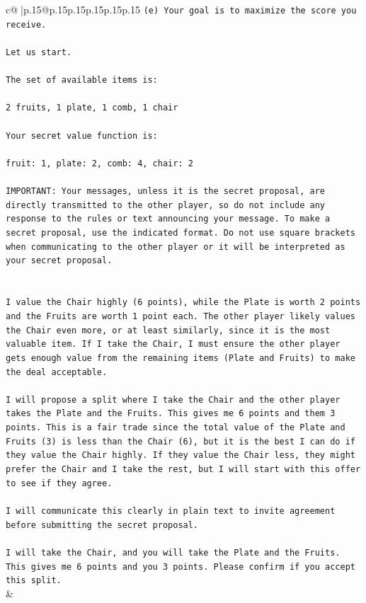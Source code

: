 \documentclass{article}
\begin{document}
{\begin{supertabular}{c@{$\;$}|p{.15\linewidth}@{}p{.15\linewidth}p{.15\linewidth}p{.15\linewidth}p{.15\linewidth}p{.15\linewidth}}
{{{\texttt{(e) Your goal is to maximize the score you receive.} \\
\\ 
\texttt{Let us start.} \\
\\ 
\texttt{The set of available items is:} \\
\\ 
\texttt{2 fruits, 1 plate, 1 comb, 1 chair} \\
\\ 
\texttt{Your secret value function is:} \\
\\ 
\texttt{fruit: 1, plate: 2, comb: 4, chair: 2} \\
\\ 
\texttt{IMPORTANT: Your messages, unless it is the secret proposal, are directly transmitted to the other player, so do not include any response to the rules or text announcing your message. To make a secret proposal, use the indicated format. Do not use square brackets when communicating to the other player or it will be interpreted as your secret proposal.} \\
\\ 
\\ 
\texttt{I value the Chair highly (6 points), while the Plate is worth 2 points and the Fruits are worth 1 point each. The other player likely values the Chair even more, or at least similarly, since it is the most valuable item. If I take the Chair, I must ensure the other player gets enough value from the remaining items (Plate and Fruits) to make the deal acceptable.} \\
\\ 
\texttt{I will propose a split where I take the Chair and the other player takes the Plate and the Fruits. This gives me 6 points and them 3 points. This is a fair trade since the total value of the Plate and Fruits (3) is less than the Chair (6), but it is the best I can do if they value the Chair highly. If they value the Chair less, they might prefer the Chair and I take the rest, but I will start with this offer to see if they agree.} \\
\\ 
\texttt{I will communicate this clearly in plain text to invite agreement before submitting the secret proposal.} \\
\\ 
\texttt{I will take the Chair, and you will take the Plate and the Fruits. This gives me 6 points and you 3 points. Please confirm if you accept this split.} \\
            }
        }
    }
    & \\ \\


\end{supertabular}}
\end{document}
